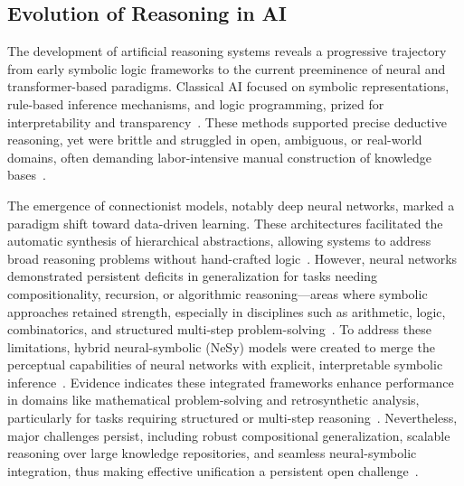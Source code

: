 \documentclass[sigconf]{acmart}
\begin{document}
\subsection{Evolution of Reasoning in AI}

The development of artificial reasoning systems reveals a progressive trajectory from early symbolic logic frameworks to the current preeminence of neural and transformer-based paradigms. Classical AI focused on symbolic representations, rule-based inference mechanisms, and logic programming, prized for interpretability and transparency~\cite{ref42,ref49,ref54,ref86}. These methods supported precise deductive reasoning, yet were brittle and struggled in open, ambiguous, or real-world domains, often demanding labor-intensive manual construction of knowledge bases~\cite{ref86}.

The emergence of connectionist models, notably deep neural networks, marked a paradigm shift toward data-driven learning. These architectures facilitated the automatic synthesis of hierarchical abstractions, allowing systems to address broad reasoning problems without hand-crafted logic~\cite{ref54}. However, neural networks demonstrated persistent deficits in generalization for tasks needing compositionality, recursion, or algorithmic reasoning—areas where symbolic approaches retained strength, especially in disciplines such as arithmetic, logic, combinatorics, and structured multi-step problem-solving~\cite{ref42,ref49}. To address these limitations, hybrid neural-symbolic (NeSy) models were created to merge the perceptual capabilities of neural networks with explicit, interpretable symbolic inference~\cite{ref49,ref54}. Evidence indicates these integrated frameworks enhance performance in domains like mathematical problem-solving and retrosynthetic analysis, particularly for tasks requiring structured or multi-step reasoning~\cite{ref49}. Nevertheless, major challenges persist, including robust compositional generalization, scalable reasoning over large knowledge repositories, and seamless neural-symbolic integration, thus making effective unification a persistent open challenge~\cite{ref49,ref86}.
\end{document}
